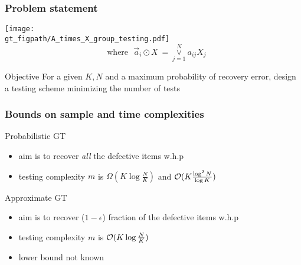 \begin{frame} \frametitle{Problem statement}
\centering
\texttt{[image: \\gt\_figpath/A\_times\_X\_group\_testing.pdf]}
\[
~~\text{ where~~}		\vec{a}_i\odot X ~= \overset{N}{\underset{j=1}{\vee}} a_{ij}X_j 
\]
\pause
\begin{block}{Objective}
For a given $K,N$ and a maximum probability of recovery error, design a testing scheme minimizing the number of tests
\end{block}
\end{frame}
\begin{frame} \frametitle{Bounds on sample and time complexities}
\begin{block}{Probabilistic GT}
\begin{itemize}
\item aim is to recover \emph{all} the defective items w.h.p
\item testing complexity $m$ is $\Omega(K\log \frac{N}{K})$ and $\mathcal{O}(K\frac{\log^2 N}{\log K})$
\end{itemize}
\end{block}

\pause
\vspace{6ex}
\begin{block}{Approximate GT}
\begin{itemize}
\item aim is to recover ($1-\epsilon$) fraction of the defective items w.h.p
\item testing complexity $m$ is $\mathcal{O}(K\log \frac{N}{K})$
\item lower bound not known
\end{itemize}
\end{block}

\end{frame}

